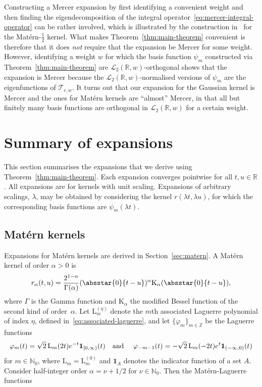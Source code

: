 \documentclass{article}
\newcommand{\tmem}[1]{{\em #1\/}}
\newcommand{\R}{\mathbb{R}}
\newcommand{\N}{\mathbb{N}}
\newcommand{\Z}{\mathbb{Z}}
\begin{document}
Constructing a Mercer expansion by first identifying a convenient weight and
then finding the eigendecomposition of the integral
operator~\eqref{eq:mercer-integral-operator} can be rather involved, which is
illustrated by the construction in~{\cite[Example~2.5]{FasshauerMcCourt2015}}
for the Mat{\'e}rn-$\frac{1}{2}$ kernel. What makes 
Theorem~\ref{thm:main-theorem} convenient is therefore that it does
{\tmem{not}} require that the expansion be Mercer for some weight. However,
identifying a weight $w$ for which the basis function $\psi_m$ constructed via
Theorem~\ref{thm:main-theorem} are $\mathscr{L}_2 (\R, w)$-orthogonal shows
that the expansion is Mercer because the $\mathscr{L}_2 (\R, w)$-normalised
versions of $\psi_m$ are the eigenfunctions of $\mathcal{T}_{r, w}$. It turns
out that our expansion for the Gaussian kernel is Mercer and the ones for
Mat{\'e}rn kernels are ``almost'' Mercer, in that all but finitely many basis
functions are orthogonal in $\mathscr{L}_2 (\R, w)$ for a certain weight.

\section{Summary of expansions}\label{sec:summary}

This section summarises the expansions that we derive using 
Theorem~\ref{thm:main-theorem}. Each expansion converges pointwise for all $t,
u \in \R$. All expansions are for kernels with unit scaling. Expansions of
arbitrary scalings, $\lambda$, may be obtained by considering the kernel $r
(\lambda t, \lambda u)$, for which the corresponding basis functions are
$\psi_m  (\lambda t)$.

\subsection{Mat{\'e}rn kernels}

Expansions for Mat{\'e}rn kernels are derived in  Section~\ref{sec:matern}. A
Mat{\'e}rn kernel of order $\alpha > 0$ is
\begin{equation}
  \label{eq:matern-kernel-intro} r_{\alpha} (t, u) = \frac{2^{1 -
  \alpha}}{\Gamma (\alpha)} (\absstar{0}{t - u})^{\alpha} \mathrm{K}_{\alpha}
  (\absstar{0}{t - u}),
\end{equation}
where $\Gamma$ is the Gamma function and $\mathrm{K}_{\alpha}$ the modified
Bessel function of the second kind of order~$\alpha$. Let
$\mathrm{L}_m^{(\eta)}$ denote the $m$th associated Laguerre polynomial of
index $\eta$, defined in~\eqref{eq:associated-laguerre}, and let $\{\varphi_m
\}_{m \in \Z}$ be the Laguerre functions
\[ \varphi_m (t) = \sqrt{2} \hspace{0.17em} \mathrm{L}_m (2 t) e^{- t} 
   \textbf{1}_{[0, \infty)} (t)  \quad \text{and } \quad \varphi_{- m - 1} (t)
   = - \sqrt{2} \hspace{0.17em} \mathrm{L}_m (- 2 t) e^t  \textbf{1}_{(-
   \infty, 0)} (t) \]
for $m \in \N_0$, where $\mathrm{L}_m = \mathrm{L}_m^{(0)}$ and $\textbf{1}_A$
denotes the indicator function of a set $A$. Consider half-integer order
$\alpha = \nu + 1 / 2$ for $\nu \in \N_0$. Then the Mat{\'e}rn-Laguerre
functions
\end{document}
